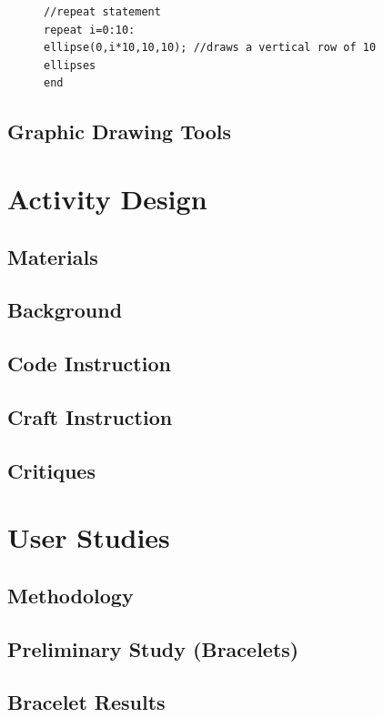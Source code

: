 \documentclass{sigchi}
\begin{document}
 \begin{center}
\begin{figure}
\begin{lstlisting}
//repeat statement
repeat i=0:10:
ellipse(0,i*10,10,10); //draws a vertical row of 10 ellipses
end
\end{lstlisting}
\end{figure}
\end{center}

\subsection{Graphic Drawing Tools}

\section{Activity Design}
\subsection{Materials}
\subsection{Background}
\subsection{Code Instruction}
\subsection{Craft Instruction}
\subsection{Critiques}

\section{User Studies}
	\subsection{Methodology}
	\subsection{Preliminary Study (Bracelets)}
	\subsection{Bracelet Results}
\end{document}

